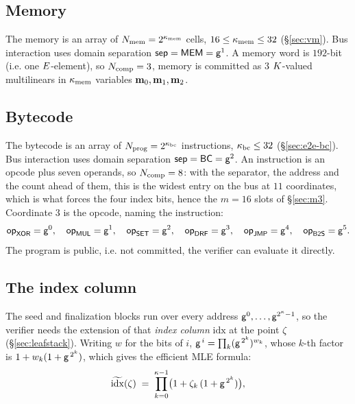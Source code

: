 \subsection{Memory}\label{sec:memchan}

The memory is an array of $N_{\mathrm{mem}} = 2^{\kappa_{\mathrm{mem}}}$ cells, $16\le\kappa_{\mathrm{mem}}\le32$ (\S\ref{sec:vm}). Bus interaction uses domain separation $\mathsf{sep}=\mathsf{MEM} = \mathsf{g}^{1}$. A memory word is $192$-bit (i.e. one $E$-element), so $N_{\mathrm{comp}}=3$, memory is committed as 3 $K$-valued multilinears in $\kappa_{\mathrm{mem}}$ variables $\mathbf{m}_0,\mathbf{m}_1,\mathbf{m}_2$.

\subsection{Bytecode}\label{sec:bytecode}

The bytecode is an array of $N_{\mathrm{prog}} = 2^{\kappa_{\mathrm{bc}}}$ instructions, $\kappa_{\mathrm{bc}} \le 32$ (\S\ref{sec:e2e-bc}). Bus interaction uses domain separation $\mathsf{sep}=\mathsf{BC} = \mathsf{g}^{2}$. An instruction is an opcode plus seven operands, so $N_{\mathrm{comp}}=8$: with the separator, the address and the count ahead of them, this is the widest entry on the bus at $11$ coordinates, which is what forces the four index bits, hence the $m=16$ slots of \S\ref{sec:m3}. Coordinate $3$ is the opcode, naming the instruction:
\[
  \mathsf{op}_{\mathsf{XOR}}=\mathsf{g}^{0},\quad \mathsf{op}_{\mathsf{MUL}}=\mathsf{g}^{1},\quad \mathsf{op}_{\mathsf{SET}}=\mathsf{g}^{2},\quad \mathsf{op}_{\mathsf{DRF}}=\mathsf{g}^{3},\quad \mathsf{op}_{\mathsf{JMP}}=\mathsf{g}^{4},\quad \mathsf{op}_{\mathsf{B2S}}=\mathsf{g}^{5}.
\] The program is public, i.e. not committed, the verifier can evaluate it directly.

\subsection{The index column}\label{sec:idxcol}

The seed and finalization blocks run over every address $\mathsf{g}^{0},\dots,\mathsf{g}^{2^{\kappa}-1}$, so the verifier needs the extension of that \emph{index column} $\mathrm{idx}$ at the point $\zeta$ (\S\ref{sec:leafstack}). Writing $w$ for the bits of $i$, $\mathsf{g}^{\,i}=\prod_k(\mathsf{g}^{\,2^{k}})^{w_k}$, whose $k$-th factor is $1+w_k(1+\mathsf{g}^{\,2^{k}})$, which gives the efficient MLE formula:
\[
  \widetilde{\mathrm{idx}}(\zeta)\;=\;\prod_{k=0}^{\kappa-1}\bigl(1+\zeta_k\,(1+\mathsf{g}^{\,2^{k}})\bigr),
\]
